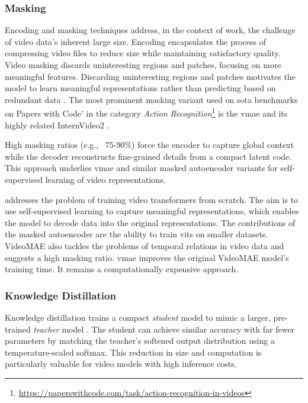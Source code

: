 \subsubsection{Masking}

Encoding and masking techniques address, in the context of work, the challenge of video data's inherent large size. Encoding encapsulates the process of compressing video files to reduce size while maintaining satisfactory quality. Video masking discards uninteresting regions and patches, focusing on more meaningful features. Discarding uninteresting regions and patches motivates the model to learn meaningful representations rather than predicting based on redundant data \cite{tong_videomae_2022}. The most prominent masking variant used on \acrshort{sota} benchmarks on Papers with Code' in the category \textit{Action Recognition}\footnote{\url{https://paperswithcode.com/task/action-recognition-in-videos}} is the \acrfull{vmae} \cite{wang_videomae_2023} and its highly related InternVideo2 \cite{wang_internvideo2_2024}. 

High masking ratios (e.g., \ 75-90\%) force the encoder to capture global context while the decoder reconstructs fine-grained details from a compact latent code. This approach underlies \acrshort{vmae} and similar masked autoencoder variants for self-supervised learning of video representations.

\textcite{tong_videomae_2022} addresses the problem of training video transformers from scratch. The aim is to use self-supervised learning to capture meaningful representations, which enables the model to decode data into the original representations. The contributions of the masked autoencoder \cite{tong_videomae_2022} are the ability to train \acrshort{vit}s on smaller datasets. VideoMAE \cite{tong_videomae_2022} also tackles the problems of temporal relations in video data and suggests a high masking ratio. \acrfull{vmae} \cite{wang_videomae_2023} improves the original VideoMAE model's training time. It remains a computationally expensive approach. 


\subsubsection{Knowledge Distillation}
\label{sssec:knowledge_distillation}

Knowledge distillation trains a compact \emph{student} model to mimic a larger, pre-trained \emph{teacher} model \cite{denize_comedian_2024, li_videomamba_2024, bose_soccerkdnet_2023}. The student can achieve similar accuracy with far fewer parameters by matching the teacher's softened output distribution using a temperature-scaled softmax. This reduction in size and computation is particularly valuable for video models with high inference costs.

